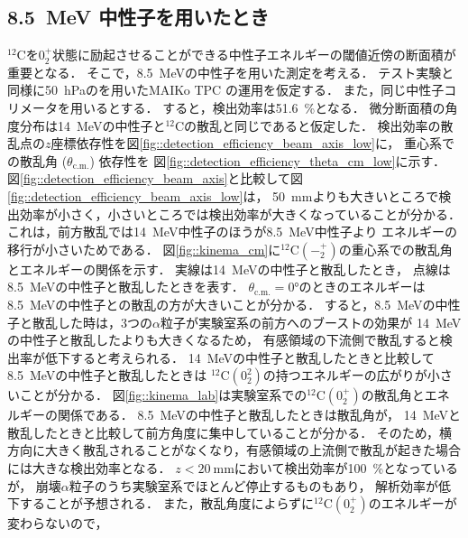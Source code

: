 \documentclass[../master]{subfiles}
\begin{document}
\subsection{8.5~MeV 中性子を用いたとき}
${}^{12}\mathrm{C}$を$0_2^+$状態に励起させることができる中性子エネルギーの閾値近傍の断面積が重要となる．
そこで，\SI{8.5}{\mega\electronvolt}の中性子を用いた測定を考える．
テスト実験と同様に\SI{50}{\hecto\pascal}の\isoButaneHydro を用いたMAIKo TPC の運用を仮定する．
また，同じ中性子コリメータを用いるとする．
すると，検出効率は\SI{51.6}{\percent}となる．
微分断面積の角度分布は\SI{14}{\mega\electronvolt}の中性子と${}^{12}\mathrm{C}$の散乱と同じであると仮定した．
検出効率の散乱点の$z$座標依存性を図\ref{fig::detection_efficiency_beam_axis_low}に，
重心系での散乱角 ($\theta_{\text{c.m.}}$) 依存性を
図\ref{fig::detection_efficiency_theta_cm_low}に示す．
図\ref{fig::detection_efficiency_beam_axis}と比較して図\ref{fig::detection_efficiency_beam_axis_low}は，
\SI{50}{\milli\metre}よりも大きいところで検出効率が小さく，小さいところでは検出効率が大きくなっていることが分かる．
これは，前方散乱では\SI{14}{\mega\electronvolt}中性子のほうが\SI{8.5}{\mega\electronvolt}中性子より
エネルギーの移行が小さいためである．
図\ref{fig::kinema_cm}に${}^{12}\mathrm{C}(-_2^+)$の重心系での散乱角とエネルギーの関係を示す．
実線は\SI{14}{\mega\electronvolt}の中性子と散乱したとき，
点線は\SI{8.5}{\mega\electronvolt}の中性子と散乱したときを表す．
$\theta_{\text{c.m.}} = $\ang{0}のときのエネルギーは\SI{8.5}{\mega\electronvolt}の中性子との散乱の方が大きいことが分かる．
すると，\SI{8.5}{\mega\electronvolt}の中性子と散乱した時は，3つの$\alpha$粒子が実験室系の前方へのブーストの効果が
\SI{14}{\mega\electronvolt}の中性子と散乱したよりも大きくなるため，
有感領域の下流側で散乱すると検出率が低下すると考えられる．
\SI{14}{\mega\electronvolt}の中性子と散乱したときと比較して\SI{8.5}{\mega\electronvolt}の中性子と散乱したときは
${}^{12}\mathrm{C}(0_2^2)$の持つエネルギーの広がりが小さいことが分かる．
図\ref{fig::kinema_lab}は実験室系での${}^{12}\mathrm{C}(0_2^+)$の散乱角とエネルギーの関係である．
\SI{8.5}{\mega\electronvolt}の中性子と散乱したときは散乱角が，
\SI{14}{\mega\electronvolt}と散乱したときと比較して前方角度に集中していることが分かる．
そのため，横方向に大きく散乱されることがなくなり，有感領域の上流側で散乱が起きた場合には大きな検出効率となる．
$z < \SI{20}{\milli\metre}$において検出効率が\SI{100}{\percent}となっているが，
崩壊$\alpha$粒子のうち実験室系でほとんど停止するものもあり，
解析効率が低下することが予想される．
また，散乱角度によらずに${}^{12}\mathrm{C}(0_2^+)$のエネルギーが変わらないので，
\end{document}
